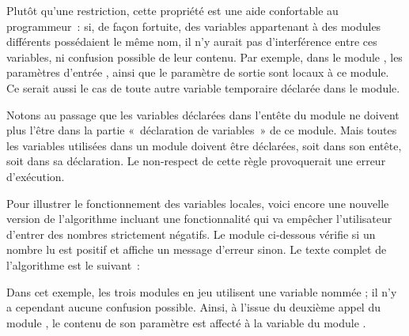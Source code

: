 	Plutôt qu’une restriction, cette propriété est
	une aide confortable au programmeur~: si, de
	façon fortuite, des variables appartenant à des modules différents
	possédaient le même nom, il n’y aurait pas d’interférence entre ces
	variables, ni confusion possible de leur
	contenu. Par exemple, dans le module
	, les paramètres d’entrée 
	, 
	ainsi que le paramètre de sortie 
	sont locaux à ce module. 
	Ce serait aussi le cas de toute autre variable temporaire 
	déclarée dans le module.

	Notons au passage que les variables déclarées dans l’entête du module ne
	doivent plus l’être dans la partie «~déclaration de variables~» de ce
	module. Mais toutes les variables utilisées dans un module doivent être
	déclarées, soit dans son entête, soit dans sa déclaration. Le
	non-respect de cette règle provoquerait une erreur d’exécution.

	Pour illustrer le fonctionnement des variables
	locales, voici encore une nouvelle version de l’algorithme incluant une
	fonctionnalité qui va empêcher l’utilisateur d’entrer des nombres
	strictement négatifs. Le module
	 ci-dessous
	vérifie si un nombre lu est positif et affiche un message
	d'erreur sinon. Le texte complet de l’algorithme est
	le suivant~:




	Dans cet exemple, les trois modules en jeu utilisent 
	une variable nommée ; 
	il n’y a cependant aucune confusion possible. 
	Ainsi, à l’issue du deuxième appel du module
	, 
	le contenu de son paramètre 
	est affecté à la variable 
	du module .

